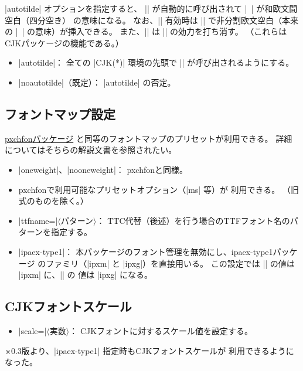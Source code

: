 \documentclass[a4paper]{ltjsarticle}
\newcommand{\Pkg}[1]{\textsf{#1}}
\newcommand{\Meta}[1]{$\langle$\mbox{}#1\mbox{}$\rangle$}
\newcommand{\Note}{\par\noindent ※}
\newcommand{\Means}{：\quad}
\begin{document}
|autotilde| オプションを指定すると、
|\CJKtilde| が自動的に呼び出されて |~| が和欧文間空白（四分空き）
の意味になる。
なお、|\CJKtilde| 有効時は |\nbs| で非分割欧文空白（本来の |~|
の意味）が挿入できる。
また、|\standardtilde| は |\CJKtilde| の効力を打ち消す。
（これらは\Pkg{CJK}パッケージの機能である。）

\begin{itemize}
\item |autotilde|\Means
  全ての |CJK(*)| 環境の先頭で |\autotilde| が呼び出されるようにする。
\item |noautotilde|（既定）\Means
  |autotilde| の否定。
\end{itemize}

\subsection{フォントマップ設定}

\href{http://www.ctan.org/pkg/pxchfon}{\Pkg{pxchfon}パッケージ}%
と同等のフォントマップのプリセットが利用できる。
詳細についてはそちらの解説文書を参照されたい。

\begin{itemize}
\item |oneweight|、|nooneweight|\Means
  \Pkg{pxchfon}と同様。
\item \Pkg{pxchfon}で利用可能なプリセットオプション（|ms| 等）が
  利用できる。
  （旧式のものを除く。）
\item |ttfname=|\Meta{パターン}\Means
  TTC代替（後述）を行う場合のTTFフォント名のパターンを指定する。
\item |ipaex-type1|\Means
  本パッケージのフォント管理を無効にし、\Pkg{ipaex-type1}パッケージ
  のファミリ（|ipxm| と |ipxg|）を直接用いる。
  この設定では |\mcdefault| の値は |ipxm| に、|\gtdefault| の
  値は |ipxg| になる。
\end{itemize}

\subsection{CJKフォントスケール}

\begin{itemize}
\item |scale=|\Meta{実数}\Means
  CJKフォントに対するスケール値を設定する。
\end{itemize}

\Note 0.3版より、|ipaex-type1| 指定時もCJKフォントスケールが
利用できるようになった。
\end{document}
